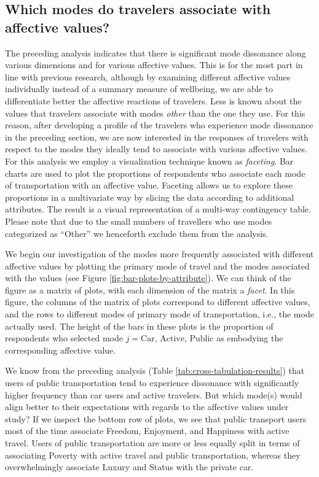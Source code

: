 \documentclass[]{elsarticle} %
\begin{document}
\hypertarget{which-modes-do-travelers-associate-with-affective-values}{%
\subsection{Which modes do travelers associate with affective
values?}\label{which-modes-do-travelers-associate-with-affective-values}}

The preceding analysis indicates that there is significant mode
dissonance along various dimensions and for various affective values.
This is for the most part in line with previous research, although by
examining different affective values individually instead of a summary
measure of wellbeing, we are able to differentiate better the affective
reactions of travelers. Less is known about the values that travelers
associate with modes \emph{other} than the one they use. For this
reason, after developing a profile of the travelers who experience mode
dissonance in the preceding section, we are now interested in the
responses of travelers with respect to the modes they ideally tend to
associate with various affective values. For this analysis we employ a
visualization technique known as \emph{faceting}. Bar charts are used to
plot the proportions of respondents who associate each mode of
transportation with an affective value. Faceting allows us to explore
these proportions in a multivariate way by slicing the data according to
additional attributes. The result is a visual representation of a
multi-way contingency table. Please note that due to the small numbers
of travellers who use modes categorized as ``Other'' we henceforth
exclude them from the analysis.

We begin our investigation of the modes more frequently associated with
different affective values by plotting the primary mode of travel and
the modes associated with the values (see Figure
\ref{fig:bar-plots-by-attribute}). We can think of the figure as a
matrix of plots, with each dimension of the matrix a \emph{facet}. In
this figure, the columns of the matrix of plots correspond to different
affective values, and the rows to different modes of primary mode of
transportation, i.e., the mode actually used. The height of the bars in
these plots is the proportion of respondents who selected mode
\(j = \text{Car, Active, Public}\) as embodying the corresponding
affective value.

We know from the preceding analysis (Table
\ref{tab:cross-tabulation-results}) that users of public transportation
tend to experience dissonance with significantly higher frequency than
car users and active travelers. But which mode(s) would align better to
their expectations with regards to the affective values under study? If
we inspect the bottom row of plots, we see that public transport users
most of the time associate Freedom, Enjoyment, and Happiness with active
travel. Users of public transportation are more or less equally split in
terms of associating Poverty with active travel and public
transportation, whereas they overwhelmingly associate Luxury and Status
with the private car.
\end{document}
